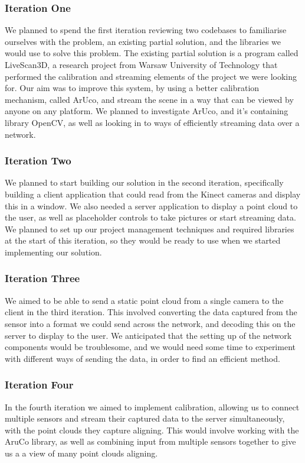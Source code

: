 \documentclass{article}
\begin{document}
\subsubsection{Iteration One}
We planned to spend the first iteration reviewing two codebases to familiarise ourselves with the problem, an existing partial solution, and the libraries we would use to solve this problem. The existing partial solution is a program called LiveScan3D, a research project from Warsaw University of Technology that performed the calibration and streaming elements of the project we were looking for. Our aim was to improve this system, by using a better calibration mechanism, called ArUco, and stream the scene in a way that can be viewed by anyone on any platform. We planned to investigate ArUco, and it's containing library OpenCV, as well as looking in to ways of efficiently streaming data over a network.
\subsubsection{Iteration Two}
We planned to start building our solution in the second iteration, specifically building a client application that could read from the Kinect cameras and display this in a window. We also needed a server application to display a point cloud to the user, as well as placeholder controls to take pictures or start streaming data. We planned to set up our project management techniques and required libraries at the start of this iteration, so they would be ready to use when we started implementing our solution.
\subsubsection{Iteration Three}
We aimed to be able to send a static point cloud from a single camera to the client in the third iteration. This involved converting the data captured from the sensor into a format we could send across the network, and decoding this on the server to display to the user. We anticipated that the setting up of the network components would be troublesome, and we would need some time to experiment with different ways of sending the data, in order to find an efficient method.
\subsubsection{Iteration Four}
In the fourth iteration we aimed to implement calibration, allowing us to connect multiple sensors and stream their captured data to the server simultaneously, with the point clouds they capture aligning. This would involve working with the AruCo library, as well as combining input from multiple sensors together to give us a a view of many point clouds aligning.
\end{document}
